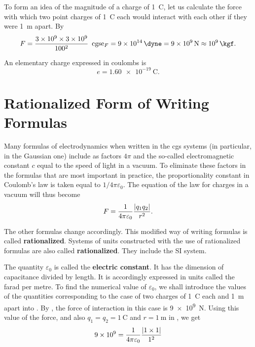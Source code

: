 To form an idea of the magnitude of a charge of \SI{1}{\coulomb}, let us calculate the force with which two point charges of \SI{1}{\coulomb} each would interact with each other if they were \SI{1}{\metre} apart. By 
\begin{equation}\label{eq:1_9}
	F = \frac{\num{3e9}\times\num{3e9}}{100^2}\,\text{ cgse$_F$} = \SI{9e14}{\dyne} = \SI{9e9}{\newton} \approx \SI{e9}{\kgf}.
\end{equation}

An elementary charge expressed in coulombs is
\begin{equation}\label{eq:1_10}
	e = \SI{1.60e-19}{\coulomb}.
\end{equation}

\section{Rationalized Form of Writing Formulas}\label{sec:1_4}

Many formulas of electrodynamics when written in the cgs systems (in particular, in the Gaussian one) include as factors $4\pi$ and the so-called electromagnetic constant $c$ equal to the speed of light in a vacuum. To eliminate these factors in the formulas that are most important in practice, the proportionality constant in Coulomb's law is taken equal to $1/4\pi\varepsilon_0$. The equation of the law for charges in a vacuum will thus become
\begin{equation}\label{eq:1_11}
	F = \frac{1}{4\pi\varepsilon_0}\frac{\left| q_1 q_2 \right|}{r^2}.
\end{equation}

\noindent
The other formulas change accordingly. This modified way of writing formulas is called \textbf{rationalized}. Systems of units constructed with the use of rationalized formulas are also called \textbf{rationalized}. They include the SI system.

The quantity $\varepsilon_0$ is called the \textbf{electric constant}. It has the dimension of capacitance divided by length. It is accordingly expressed in units called the farad per metre. To find the numerical value of $\varepsilon_0$, we shall introduce the values of the quantities corresponding to the case of two charges of \SI{1}{\coulomb} each and \SI{1}{\metre} apart into . By , the force of interaction in this case is \SI{9e9}{\newton}. Using this value of the force, and also $q_1=q_2=\SI{1}{\coulomb}$ and $r=\SI{1}{\metre}$ in , we get
\begin{equation*}
	\num{9e9} = \frac{1}{4\pi\varepsilon_0}\frac{\left| 1\times 1 \right|}{1^2}
\end{equation*}

